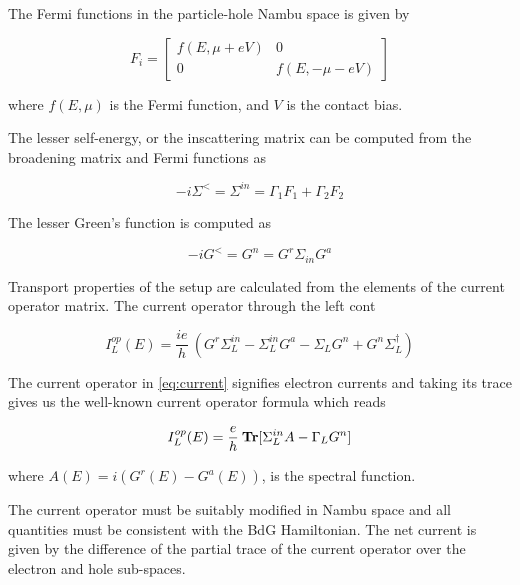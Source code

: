 The Fermi functions in the particle-hole Nambu space is given by

\begin{equation}
	F_{i} = 
	\begin{bmatrix}
	 	f(E,\mu+eV) & 0 \\
	 	0 & f(E,-\mu-eV)
	 \end{bmatrix} 
\end{equation}

where $f(E,\mu)$ is the Fermi function, and $V$ is the contact bias. \par

The lesser self-energy, or the inscattering matrix can be computed from the broadening matrix and Fermi functions as 

\begin{equation}
	-i\Sigma^{<} = \Sigma^{in} = \Gamma_{1}F_{1} + \Gamma_{2}F_{2}
\end{equation}

The lesser Green's function is computed as

\begin{equation}
	-iG^{<} = G^{n} = G^{r}\Sigma_{in}G^{a}
\end{equation}

Transport properties of the setup are calculated from the elements of the current operator matrix. The current operator through the left cont

\begin{equation} \label{eq:current}
	I^{op}_{L}(E) = \frac{ie}{h}\:(G^{r}\Sigma_{L}^{in}-\Sigma_{L}^{in}G^{a}-\Sigma_{L}G^{n}+G^{n}\Sigma_{L}^{\dagger})
\end{equation}

The current operator in \ref{eq:current} signifies electron currents and taking its trace gives us the well-known current operator formula which reads

\begin{equation}
	I^{op}_{L}(E) = \frac{e}{h}\:\text{\bf{Tr}}[\Sigma^{in}_{L}A-\Gamma_{L}G^{n}]
\end{equation}

where $A(E) = i(G^{r}(E)-G^{a}(E))$, is the spectral function. \par

The current operator must be suitably modified in Nambu space and all quantities must be consistent with the BdG Hamiltonian. The net current is given by the difference of the partial trace of the current operator over the electron and hole sub-spaces.

